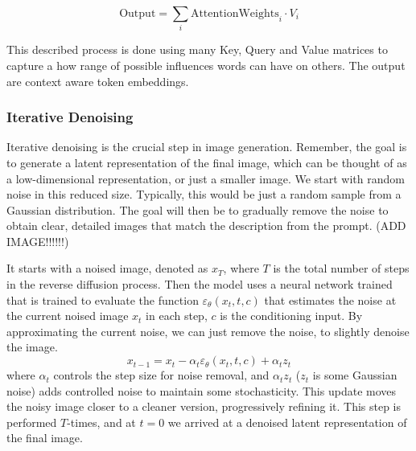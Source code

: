 \documentclass[11pt]{article}
\begin{document}
    $$\mathrm{Output} = \sum_i \mathrm{Attention Weights}_i \cdot V_i$$

    This described process is done using many Key, Query and Value matrices to capture a how range of possible influences words can have on others. The output are context aware token embeddings.
\fi

\subsubsection{Iterative Denoising}
Iterative denoising is the crucial step in image generation. Remember, the goal is to generate a latent representation of the final image, which can be thought of as a low-dimensional representation, or just a smaller image. We start with random noise in this reduced size. Typically, this would be just a random sample from a Gaussian distribution. The goal will then be to gradually remove the noise to obtain clear, detailed images that match the description from the prompt. (ADD IMAGE!!!!!!)

It starts with a noised image, denoted as $x_T$, where $T$ is the total number of steps in the reverse diffusion process. Then the model uses a neural network trained that is trained to evaluate the function $\varepsilon_\theta(x_t,t,c)$ that estimates the noise at the current noised image $x_t$ in each step, $c$ is the conditioning input. By approximating the current noise, we can just remove the noise, to slightly denoise the image.
$$x_{t-1}=x_t-\alpha_t \varepsilon_\theta(x_t,t,c)+ \alpha_t z_t$$
where $\alpha_t$ controls the step size for noise removal, and $\alpha_t z_t$  ($z_t$ is some Gaussian noise) adds controlled noise to maintain some stochasticity. This update moves the noisy image closer to a cleaner version, progressively refining it. This step is performed $T$-times, and at $t=0$ we arrived at a denoised latent representation of the final image.
\end{document}
